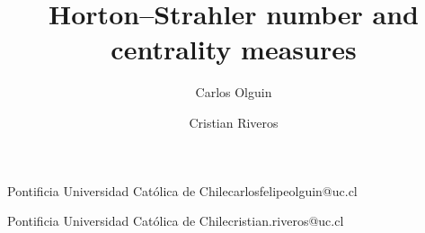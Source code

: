

\title{Horton–Strahler number and centrality measures} 


\author{Carlos Olguin}{Pontificia Universidad Católica de Chile}{carlosfelipeolguin@uc.cl}{}{}
\author{Cristian Riveros}{Pontificia Universidad Católica de Chile}{cristian.riveros@uc.cl}{}{}







\hideLIPIcs  %


